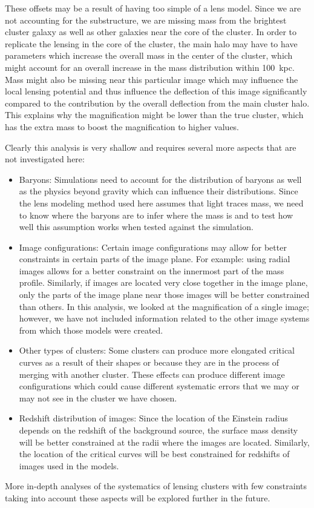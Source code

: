 These offsets may be a result of having too simple of a lens model. Since we are not accounting for the substructure, we are missing mass from the brightest cluster galaxy as well as other galaxies near the core of the cluster. In order to replicate the lensing in the core of the cluster, the main halo may have to have parameters which increase the overall mass in the center of the cluster, which might account for an overall increase in the mass distribution within 100~kpc. Mass might also be missing near this particular image which may influence the local lensing potential and thus influence the deflection of this image significantly compared to the contribution by the overall deflection from the main cluster halo. This explains why the magnification might be lower than the true cluster, which has the extra mass to boost the magnification to higher values.

Clearly this analysis is very shallow and requires several more aspects that are not investigated here:

\begin{itemize}
\item Baryons: Simulations need to account for the distribution of baryons as well as the physics beyond gravity which can influence their distributions. Since the lens modeling method used here assumes that light traces mass, we need to know where the baryons are to infer where the mass is and to test how well this assumption works when tested against the simulation.
\item Image configurations: Certain image configurations may allow for better constraints in certain parts of the image plane. For example: using radial images allows for a better constraint on the innermost part of the mass profile. Similarly, if images are located very close together in the image plane, only the parts of the image plane near those images will be better constrained than others. In this analysis, we looked at the magnification of a single image; however, we have not included information related to the other image systems from which those models were created.
\item Other types of clusters: Some clusters can produce more elongated critical curves as a result of their shapes or because they are in the process of merging with another cluster. These effects can produce different image configurations which could cause different systematic errors that we may or may not see in the cluster we have chosen.
\item Redshift distribution of images: Since the location of the Einstein radius depends on the redshift of the background source, the surface mass density will be better constrained at the radii where the images are located. Similarly, the location of the critical curves will be best constrained for redshifts of images used in the models. 
\end{itemize}

More in-depth analyses of the systematics of lensing clusters with few constraints taking into account these aspects will be explored further in the future.
